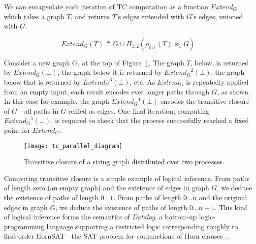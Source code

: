 We can encapsulate each iteration of TC computation as a function $\textit{Extend}_G$ which takes a graph $T$, and returns $T$'s edges extended with $G$'s edges, unioned with $G$.

\[
  \textit{Extend}_G(T) \triangleq G \cup \Pi_{1,2}(\rho_{0 / 1}(T) \bowtie_1 G)
\]

Consider a new graph $G$, at the top of Figure~\ref{fig:tc_parallel_diagram}. The graph $T$, below, is returned by $\textit{Extend}_G(\bot)$, the graph below it is returned by ${\textit{Extend}_G}^2(\bot)$, the graph below that is returned by ${\textit{Extend}_G}^3(\bot)$, etc. As $\textit{Extend}_G$ is repeatedly applied from an empty input, each result encodes ever longer paths through $G$, as shown. In this case for example, the graph ${\textit{Extend}_G}^4(\bot)$ encodes the transitive closure of $G$---all paths in $G$ reified as edges.
One final iteration, computing ${\textit{Extend}_G}^5(\bot)$, is required to check that the process successfully reached a fixed point for $\textit{Extend}_G$.

\begin{figure}[h]
\begin{center}
  \texttt{[image: tc\_parallel\_diagram]}
\end{center}
\caption{Transitive closure of a string graph distributed over two processes.}
\label{fig:tc_parallel_diagram}
\end{figure}

Computing transitive closure is a simple example of logical inference.
From paths of length zero (an empty graph) and the existence of edges in graph $G$, we deduce the existence of paths of length $0 \ldots 1$. From paths of length $0 \ldots n$ and the original edges in graph $G$, we deduce the existence of paths of length $0 \ldots n+1$.
%
This kind of logical inference forms the semantics of \emph{Datalog}, a bottom-up logic-programming language supporting a restricted logic corresponding roughly to first-order HornSAT---the SAT problem for conjunctions of Horn clauses~\cite{abiteboul1995foundations}.

